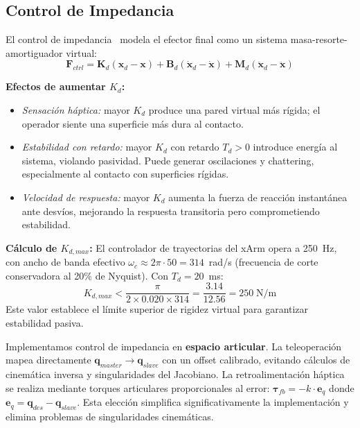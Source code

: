 \documentclass[journal,10pt,twoside]{IEEEtran}
\begin{document}
\subsection{Control de Impedancia}

El control de impedancia~\cite{hogan1985} modela el efector final como
un sistema masa-resorte-amortiguador virtual:
\begin{equation}
  \bm{F}_{ctrl} = \bm{K}_d(\bm{x}_d - \bm{x})
                + \bm{B}_d(\dot{\bm{x}}_d - \dot{\bm{x}})
                + \bm{M}_d(\ddot{\bm{x}}_d - \ddot{\bm{x}})
  \label{eq:impedance}
\end{equation}

\textbf{Efectos de aumentar $K_d$:}
\begin{itemize}
  \item \textit{Sensación háptica:} mayor $K_d$ produce una pared virtual
        más rígida; el operador siente una superficie más dura al contacto.
  \item \textit{Estabilidad con retardo:} mayor $K_d$ con retardo $T_d>0$
        introduce energía al sistema, violando pasividad. Puede generar
        oscilaciones y chattering, especialmente al contacto con superficies
        rígidas.
  \item \textit{Velocidad de respuesta:} mayor $K_d$ aumenta la fuerza
        de reacción instantánea ante desvíos, mejorando la respuesta
        transitoria pero comprometiendo estabilidad.
\end{itemize}

\textbf{Cálculo de $K_{d,max}$:}
El controlador de trayectorias del xArm opera a 250~Hz, con ancho de
banda efectivo $\omega_c \approx 2\pi \cdot 50 = 314$~rad/s (frecuencia
de corte conservadora al 20\% de Nyquist). Con $T_d=20$~ms:
\[
  K_{d,max} < \frac{\pi}{2 \times 0{.}020 \times 314} = \frac{3{.}14}{12{.}56} = 250\;\text{N/m}
\]
Este valor establece el límite superior de rigidez virtual para
garantizar estabilidad pasiva.

Implementamos control de impedancia en \textbf{espacio articular}.
La teleoperación mapea directamente $\bm{q}_{master}\to\bm{q}_{slave}$
con un offset calibrado, evitando cálculos de cinemática inversa y
singularidades del Jacobiano. La retroalimentación háptica se realiza
mediante torques articulares proporcionales al error:
$\bm{\tau}_{fb}=-k\cdot\bm{e}_q$ donde $\bm{e}_q=\bm{q}_{des}-\bm{q}_{slave}$.
Esta elección simplifica significativamente la implementación y elimina
problemas de singularidades cinemáticas.
\end{document}

